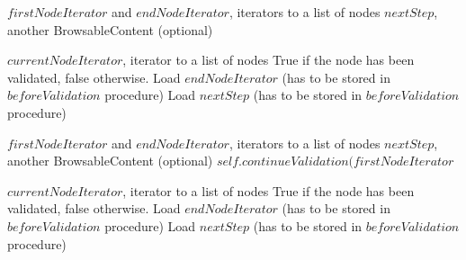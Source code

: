 \begin{algorithm}[H]
\caption{}
\begin{algorithmic}
\REQUIRE $firstNodeIterator$ and $endNodeIterator$, iterators to a list of nodes
\REQUIRE $nextStep$, another BrowsableContent (optional)
\IF{\browseDown}
\STATE {}
\RETURN \TRUE
\ELSIF{\browseUp}
\STATE {}
\RETURN \TRUE
\ELSE
\STATE {}
\RETURN \FALSE
\ENDIF
\end{algorithmic}
\end{algorithm}

\begin{algorithm}[H]
\caption{}
\begin{algorithmic}
\REQUIRE $currentNodeIterator$, iterator to a list of nodes
\ENSURE True if the node has been validated, false otherwise.
\STATE Load $endNodeIterator$ (has to be stored in $beforeValidation$ procedure)
\STATE Load $nextStep$ (has to be stored in $beforeValidation$ procedure)
\RETURN \browseUp
\end{algorithmic}
\end{algorithm}

\begin{algorithm}[H]
\caption{}
\begin{algorithmic}
\REQUIRE $firstNodeIterator$ and $endNodeIterator$, iterators to a list of nodes
\REQUIRE $nextStep$, another BrowsableContent (optional)
\STATE {}
\RETURN $self.continueValidation(firstNodeIterator$ 
\end{algorithmic}
\end{algorithm}

\begin{algorithm}[H]
\caption{}
\begin{algorithmic}
\REQUIRE $currentNodeIterator$, iterator to a list of nodes
\ENSURE True if the node has been validated, false otherwise.
\STATE Load $endNodeIterator$ (has to be stored in $beforeValidation$ procedure)
\STATE Load $nextStep$ (has to be stored in $beforeValidation$ procedure)
\IF{\browseDown}
\STATE {}
\RETURN \TRUE
\ELSIF{\browseUp}
\STATE {}
\RETURN \TRUE
\ELSE
\STATE {}
\RETURN \FALSE
\ENDIF
\end{algorithmic}
\end{algorithm}


